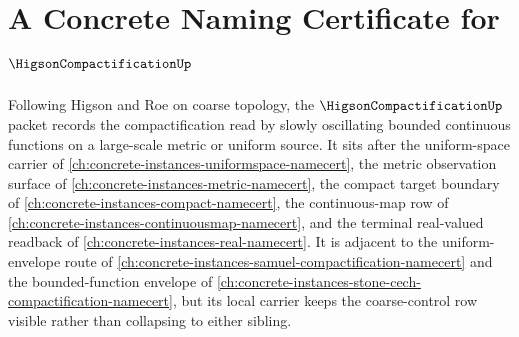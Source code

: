 \chapter{A Concrete Naming Certificate for $\HigsonCompactificationUp$}
\label{ch:concrete-instances-higson-compactification-namecert}

Following Higson and Roe on coarse topology, the $\HigsonCompactificationUp$ packet records the compactification read by slowly oscillating bounded continuous functions on a large-scale metric or uniform source. It sits after the uniform-space carrier of \autoref{ch:concrete-instances-uniformspace-namecert}, the metric observation surface of \autoref{ch:concrete-instances-metric-namecert}, the compact target boundary of \autoref{ch:concrete-instances-compact-namecert}, the continuous-map row of \autoref{ch:concrete-instances-continuousmap-namecert}, and the terminal real-valued readback of \autoref{ch:concrete-instances-real-namecert}. It is adjacent to the uniform-envelope route of \autoref{ch:concrete-instances-samuel-compactification-namecert} and the bounded-function envelope of \autoref{ch:concrete-instances-stone-cech-compactification-namecert}, but its local carrier keeps the coarse-control row visible rather than collapsing to either sibling.

